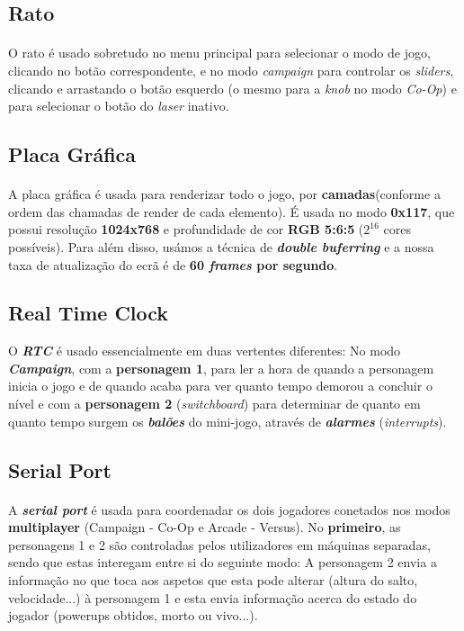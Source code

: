 \documentclass{report}
\begin{document}
\subsection{Rato}

\paragraph{}
O rato é usado sobretudo no menu principal para selecionar o modo de jogo, clicando no botão correspondente, e no modo \textit{campaign} para controlar os \textit{sliders}, clicando e arrastando o botão esquerdo (o mesmo para a \textit{knob} no modo \textit{Co-Op}) e para selecionar o botão do \textit{laser} inativo.  

\subsection{Placa Gráfica}

\paragraph{}
A placa gráfica é usada para renderizar todo o jogo, por \textbf{camadas}(conforme a ordem das chamadas de render de cada elemento). É usada no modo \textbf{0x117}, que possui resolução \textbf{1024x768} e profundidade de cor \textbf{RGB 5:6:5} ($2^{16}$ cores possíveis).
Para além disso, usámos a técnica de \textbf{\textit{double buferring}} e a nossa taxa de atualização do ecrã é de \textbf{60 \textit{frames} por segundo}.

\subsection{Real Time Clock}

O \textbf{\textit{RTC}} é usado essencialmente em duas vertentes diferentes: No modo \textbf{\textit{Campaign}}, com a \textbf{personagem 1}, para ler a hora de quando a personagem inicia o jogo e de quando acaba para ver quanto tempo demorou a concluir o nível e com a \textbf{personagem 2} (\textit{switchboard}) para determinar de quanto em quanto tempo surgem os \textbf{\textit{balões}} do mini-jogo, através de \textbf{\textit{alarmes}} (\textit{interrupts}).

\subsection{Serial Port}

\paragraph{}
A \textbf{\textit{serial port}} é usada para coordenadar os dois jogadores conetados nos modos \textbf{multiplayer} (Campaign - Co-Op e Arcade - Versus). No \textbf{primeiro}, as personagens 1 e 2 são controladas pelos utilizadores em máquinas separadas, sendo que estas interegam entre si do seguinte modo: A personagem 2 envia a informação no que toca aos aspetos que esta pode alterar (altura do salto, velocidade...) à personagem 1 e esta envia informação acerca do estado do jogador (powerups obtidos, morto ou vivo...).
\end{document}
